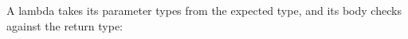 A lambda takes its parameter types from the expected  type, and its body checks against the return type:
\begin{mathpar}
\small

\end{mathpar}
